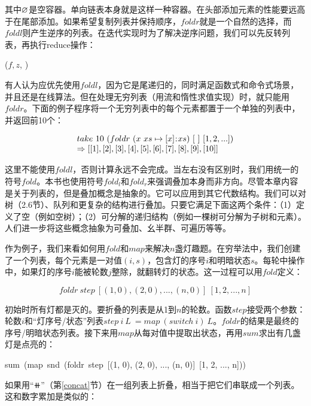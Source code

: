 \documentclass[b5paper]{ctexart}
\begin{document}
其中$\varnothing$是空容器。单向链表本身就是这样一种容器。在头部添加元素的性能要远高于在尾部添加。如果希望复制列表并保持顺序，$foldr$就是一个自然的选择，而$foldl$则产生逆序的列表。在迭代实现时为了解决逆序问题，我们可以先反转列表，再执行reduce操作：

\begin{algorithmic}[1]
  \State \Return {}($f, z$, )
\EndFunction
\end{algorithmic}

有人认为应优先使用$foldl$，因为它是尾递归的，同时满足函数式和命令式场景，并且还是在线算法。但在处理无穷列表（用流和惰性求值实现）时，就只能用$foldr$。下面的例子程序将一个无穷列表中的每个元素都置于一个单独的列表中，并返回前10个：

\[
\begin{array}{l}
take\ 10\ (foldr\ (x\ xs \mapsto [x] \mathbin{\!:\!} xs)\ [\ ]\ [1, 2, ...]) \\
\Rightarrow [[1], [2], [3], [4], [5], [6], [7], [8], [9], [10]]
\end{array}
\]

这里不能使用$foldl$，否则计算永远不会完成。当左右没有区别时，我们用统一的符号$fold$。本书也使用符号$fold_l$和$fold_r$来强调叠加本身而非方向。尽管本章内容是关于列表的，但是叠加概念是抽象的。它可以应用到其它代数结构。我们可以对树（\cite{unplugged}2.6节）、队列和更复杂的结构进行叠加。只要它满足下面这两个条件：（1）定义了空（例如空树）；（2）可分解的递归结构（例如一棵树可分解为子树和元素）。人们进一步将这些概念抽象为可叠加、幺半群、可遍历等等。

作为例子，我们来看如何用$fold$和$map$来解决$n$盏灯趣题。在穷举法中，我们创建了一个列表，每个元素是一对值$(i, s)$，包含灯的序号$i$和明暗状态$s$。每轮中操作中，如果灯的序号$i$能被轮数$j$整除，就翻转灯的状态。这一过程可以用$fold$定义：

\[
foldr\ step\ [(1, 0), (2, 0), ..., (n, 0)]\ [1, 2, ..., n]
\]

初始时所有灯都是灭的。要折叠的列表是从1到$n$的轮数。函数$step$接受两个参数：轮数$i$和“灯序号/状态”列表$step\ i\ L\ = map\ (switch\ i)\ L$。$foldr$的结果是最终的序号/明暗状态列表。接下来用$map$从每对值中提取出状态，再用$sum$求出有几盏灯是点亮的：

\be
sum\ (map\ snd\ (foldr\ step\ [(1, 0), (2, 0), ..., (n, 0)]\ [1, 2, ..., n]))
\ee

如果用“$\doubleplus$”（第\ref{concat}节）在一组列表上折叠，相当于把它们串联成一个列表。这和数字累加是类似的：
\end{document}
